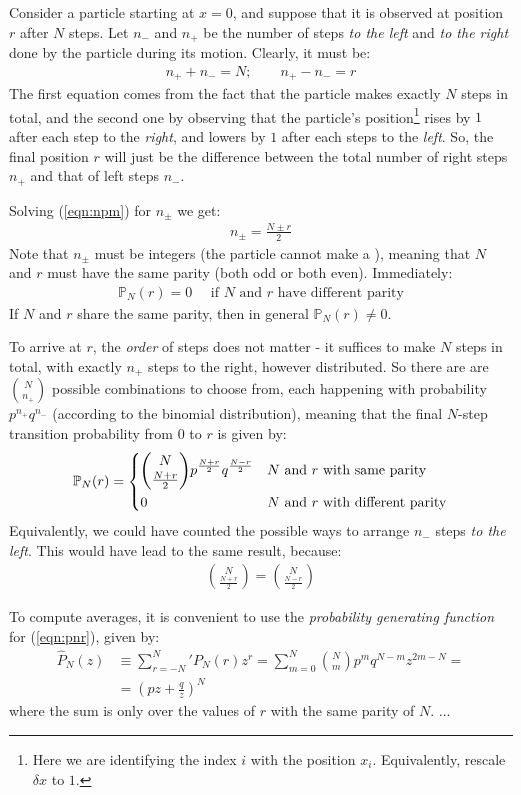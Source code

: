 \documentclass[../../main.tex]{subfiles}
\begin{document}
Consider a particle starting at $x=0$, and suppose that it is observed at position $r$ after $N$ steps. Let $n_-$ and $n_+$ be the number of steps \textit{to the left} and \textit{to the right} done by the particle during its motion. Clearly, it must be:
\begin{align}
    n_+ + n_- = N; \qquad n_+ - n_- = r \label{eqn:npm}
\end{align}  
The first equation comes from the fact that the particle makes exactly $N$ steps in total, and the second one by observing that the particle's position\footnote{Here we are identifying the index $i$ with the position $x_i$. Equivalently, rescale $\delta x$ to $1$.} rises by $1$ after each step to the \textit{right}, and lowers by $1$ after each steps to the \textit{left}. So, the final position $r$ will just be the difference between the total number of right steps $n_+$ and that of left steps $n_-$.  

\medskip

Solving (\ref{eqn:npm}) for $n_\pm$ we get:
\begin{align*}
    n_\pm = \frac{N \pm r}{2} 
\end{align*}
Note that $n_\pm$ must be integers (the particle cannot make a ), meaning that $N$ and $r$ must have the same parity (both odd or both even). Immediately:
\begin{align*}
    \mathbb{P}_N(r) = 0 \quad \text{ if $N$ and $r$ have different parity}
\end{align*}
If $N$ and $r$ share the same parity, then in general $\mathbb{P}_N(r) \neq 0$.

To arrive at $r$, the \textit{order} of steps does not matter - it suffices to make $N$ steps in total, with exactly $n_+$ steps to the right, however distributed. So there are are ${N \choose n_+}$ possible combinations to choose from, each happening with probability $p^{n_+} q^{n_-}$ (according to the binomial distribution), meaning that the final $N$-step transition probability from $0$ to $r$ is given by:
\begin{align}
    \mathbb{P}_{N}(r) = \begin{dcases}
        {N \choose \frac{N+r}{2}} p^{\frac{N+r}{2}} q^{\frac{N-r}{2}} & \text{$N$ and $r$ with same parity}\\
        0 & \text{$N$ and $r$ with different parity}
    \end{dcases} \label{eqn:pnr}
\end{align}
Equivalently, we could have counted the possible ways to arrange $n_-$ steps \textit{to the left}. This would have lead to the same result, because:
\begin{align*}
    {N\choose \frac{N+r}{2}} = {N\choose \frac{N-r}{2}}
\end{align*} 

To compute averages, it is convenient to use the \textit{probability generating function} for (\ref{eqn:pnr}), given by:
\begin{align*}
    \hat{P}_N(z) &\equiv {\sum_{r=-N}^N}' P_N(r) z^r = \sum_{m=0}^N {N\choose m} p^m q^{N-m} z^{2m - N} =\\
    &= \left(pz + \frac{q}{z} \right)^N
\end{align*}
where the sum is only over the values of $r$ with the same parity of $N$. 
...
\end{document}
